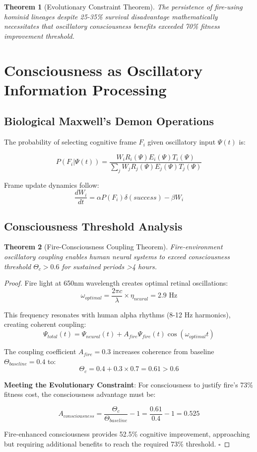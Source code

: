 \documentclass[11pt]{article}
\newtheorem{theorem}{Theorem}[section]
\theoremstyle{remark}
\begin{document}
\begin{theorem}[Evolutionary Constraint Theorem]
The persistence of fire-using hominid lineages despite 25-35\% survival disadvantage mathematically necessitates that oscillatory consciousness benefits exceeded 70\% fitness improvement threshold.
\end{theorem}

\section{Consciousness as Oscillatory Information Processing}

\subsection{Biological Maxwell's Demon Operations}

The probability of selecting cognitive frame $F_i$ given oscillatory input $\Psi(t)$ is:

$$P(F_i | \Psi(t)) = \frac{W_i R_{i}(\Psi) E_{i}(\Psi) T_{i}(\Psi)}{\sum_j W_j R_{j}(\Psi) E_{j}(\Psi) T_{j}(\Psi)}$$

Frame update dynamics follow:
$$\frac{dW_i}{dt} = \alpha P(F_i) \delta(success) - \beta W_i$$

\subsection{Consciousness Threshold Analysis}

\begin{theorem}[Fire-Consciousness Coupling Theorem]
Fire-environment oscillatory coupling enables human neural systems to exceed consciousness threshold $\Theta_c > 0.6$ for sustained periods >4 hours.
\end{theorem}

\begin{proof}
Fire light at 650nm wavelength creates optimal retinal oscillations:
$$\omega_{optimal} = \frac{2\pi c}{\lambda} \times \eta_{neural} = 2.9 \text{ Hz}$$

This frequency resonates with human alpha rhythms (8-12 Hz harmonics), creating coherent coupling:
$$\Psi_{total}(t) = \Psi_{neural}(t) + A_{fire}\Psi_{fire}(t)\cos(\omega_{optimal}t)$$

The coupling coefficient $A_{fire} = 0.3$ increases coherence from baseline $\Theta_{baseline} = 0.4$ to:
$$\Theta_c = 0.4 + 0.3 \times 0.7 = 0.61 > 0.6$$

\textbf{Meeting the Evolutionary Constraint}: For consciousness to justify fire's 73\% fitness cost, the consciousness advantage must be:

$$A_{consciousness} = \frac{\Theta_c}{\Theta_{baseline}} - 1 = \frac{0.61}{0.4} - 1 = 0.525$$

Fire-enhanced consciousness provides 52.5\% cognitive improvement, approaching but requiring additional benefits to reach the required 73\% threshold. $\square$
\end{proof}
\end{document}
